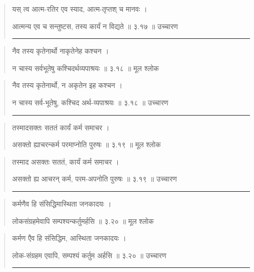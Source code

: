 \begin{quotation}
यस् त्व आत्म-रतिर एव स्याद, आत्म-तृप्तश् च मानवः  ।  

आत्मन्य एव च सन्तुष्टस, तस्य कार्यं न विद्यते  ॥ ३.१७ ॥  उच्चारण

\noindent\rule{16cm}{0.4pt} 
\end{quotation}


\begin{quotation}

नैव तस्य कृतेनार्थो नाकृतेनेह कश्चन  ।  

न चास्य सर्वभूतेषु कश्चिदर्थव्यपाश्रयः  ॥ ३.१८ ॥  मूल श्लोक
\end{quotation}

\begin{quotation}

नैव तस्य कृतेनार्थो, न अकृतेन इह कश्चन  ।  

न चास्य सर्व-भूतेषु, कश्चिद अर्थ-व्यपाश्रयः  ॥ ३.१८ ॥  उच्चारण

\noindent\rule{16cm}{0.4pt} 
\end{quotation}


\begin{quotation}

तस्मादसक्तः सततं कार्यं कर्म समाचर  ।  

असक्तो ह्याचरन्कर्म परमाप्नोति पुरुषः  ॥ ३.१९ ॥  मूल श्लोक
\end{quotation}

\begin{quotation}

तस्माद असक्तः सततं, कार्यं कर्म समाचर  ।  

असक्तो ह्य आचरन् कर्म, परम-अपनोति पुरुषः  ॥ ३.१९ ॥  उच्चारण

\noindent\rule{16cm}{0.4pt} 
\end{quotation}


\begin{quotation}

कर्मणैव हि संसिद्धिमास्थिता जनकादयः  ।  
 
लोकसंग्रहमेवापि सम्पश्यन्कर्तुमर्हसि  ॥ ३.२० ॥  मूल श्लोक
\end{quotation}

\begin{quotation}

कर्मण एैव हि संसिद्धिम, आस्थिता जनकादयः  ।  

लोक-संग्रहम एवापि, सम्पश्यं कर्तुम अर्हसि  ॥ ३.२० ॥  उच्चारण

\noindent\rule{16cm}{0.4pt} 
\end{quotation}


